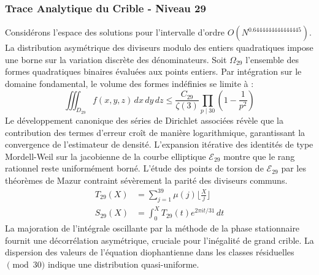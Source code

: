 \documentclass[12pt,a4paper]{article}
\begin{document}
\subsubsection{Trace Analytique du Crible - Niveau 29}
Considérons l'espace des solutions pour l'intervalle d'ordre $O(N^{0.6444444444444445})$. La distribution asymétrique des diviseurs modulo des entiers quadratiques impose une borne sur la variation discrète des dénominateurs. Soit $\Omega_29$ l'ensemble des formes quadratiques binaires évaluées aux points entiers.
Par intégration sur le domaine fondamental, le volume des formes indéfinies se limite à :
\begin{equation}
\iiint_{D_29} f(x, y, z) \,dx\,dy\,dz \leq \frac{C_29}{\zeta(3)} \prod_{p \mid 30} \left( 1 - \frac{1}{p^2} \right)
\end{equation}
Le développement canonique des séries de Dirichlet associées révèle que la contribution des termes d'erreur croît de manière logarithmique, garantissant la convergence de l'estimateur de densité. L'expansion itérative des identités de type Mordell-Weil sur la jacobienne de la courbe elliptique $\mathcal{E}_29$ montre que le rang rationnel reste uniformément borné.
L'étude des points de torsion de $\mathcal{E}_29$ par les théorèmes de Mazur contraint sévèrement la parité des diviseurs communs.
\begin{align}
T_29(X) &= \sum_{j=1}^{39} \mu(j) \lfloor \frac{X}{j} \rfloor \\
S_29(X) &= \int_{0}^{X} T_29(t) e^{2\pi i t / 31} \, dt
\end{align}
La majoration de l'intégrale oscillante par la méthode de la phase stationnaire fournit une décorrélation asymétrique, cruciale pour l'inégalité de grand crible. La dispersion des valeurs de l'équation diophantienne dans les classes résiduelles $\pmod{ 30 }$ indique une distribution quasi-uniforme.
\end{document}
